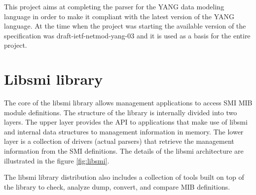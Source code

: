 \documentclass[conference]{IEEEtran}
\begin{document}
This project aims at completing the parser for the YANG data modeling language in order to make it compliant with the latest version of the YANG language. At the time when the project was starting the available version of the specification was draft-ietf-netmod-yang-03 \cite{bib3} and it is used as a basis for the entire project.


\section{Libsmi library}
The core of the libsmi library allows management applications to access SMI MIB module definitions. 
The structure of the library \cite{bib7} is internally divided into two layers. 
The upper layer provides the API to applications that make use of libsmi and internal data structures to management information in memory. 
The lower layer is a collection of drivers (actual parsers) that retrieve the management information from the SMI definitions.
The details of the libsmi architecture are illustrated in the figure \ref{fig:libsmi}.  

The libsmi library distribution also includes a collection of tools built on top of the library to check, analyze dump, convert, and compare MIB definitions.
\end{document}
